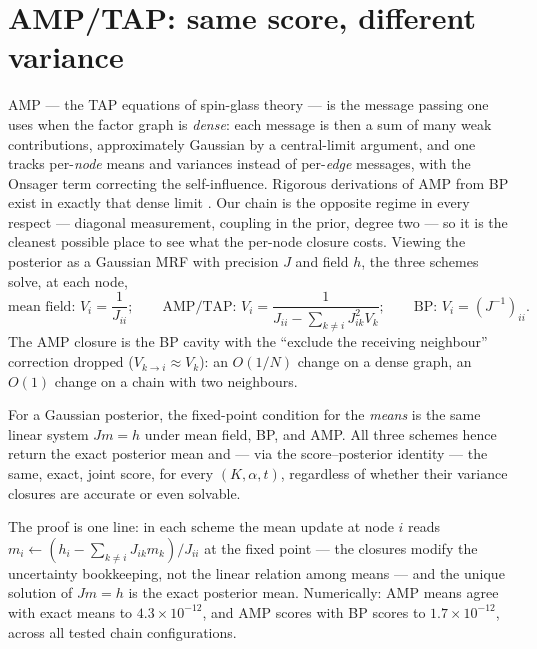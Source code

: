 \section{AMP/TAP: same score, different variance}\label{sec:bp-amp}

AMP --- the TAP equations of spin-glass theory
\citep{thouless1977solution, donoho2009message, zdeborova2016statistical}
--- is the message passing one uses when the factor graph is \emph{dense}:
each message is then a sum of many weak contributions, approximately
Gaussian by a central-limit argument, and one tracks per-\emph{node} means
and variances instead of per-\emph{edge} messages, with the Onsager term
correcting the self-influence. Rigorous derivations of AMP from BP exist
in exactly that dense limit \citep{genovese2026amp}. Our chain is the
opposite regime in every respect --- diagonal measurement, coupling in the
prior, degree two --- so it is the cleanest possible place to see what the
per-node closure costs. Viewing the posterior as a Gaussian MRF with
precision $J$ and field $h$, the three schemes solve, at each node,
\begin{equation}
  \text{mean field: } V_i = \frac{1}{J_{ii}};
  \qquad
  \text{AMP/TAP: } V_i = \frac{1}{J_{ii} - \sum_{k \neq i} J_{ik}^2 V_k};
  \qquad
  \text{BP: } V_i = (J^{-1})_{ii} .
  \label{eq:bp-three-closures}
\end{equation}
The AMP closure is the BP cavity with the ``exclude the receiving
neighbour'' correction dropped ($V_{k \to i} \approx V_k$): an $O(1/N)$
change on a dense graph, an $O(1)$ change on a chain with two neighbours.

\begin{theorem}\label{thm:bp-same-score}
For a Gaussian posterior, the fixed-point condition for the \emph{means}
is the same linear system $J m = h$ under mean field, BP, and AMP. All
three schemes hence return the exact posterior mean and --- via the
score--posterior identity --- the same, exact, joint score, for every
$(K, \alpha, t)$, regardless of whether their variance closures are
accurate or even solvable.
\end{theorem}

The proof is one line: in each scheme the mean update at node $i$ reads
$m_i \leftarrow (h_i - \sum_{k \neq i} J_{ik} m_k)/J_{ii}$ at the fixed
point --- the closures modify the uncertainty bookkeeping, not the linear
relation among means --- and the unique solution of $Jm = h$ is the exact
posterior mean. Numerically: AMP means agree with exact means to
$4.3 \times 10^{-12}$, and AMP scores with BP scores to
$1.7 \times 10^{-12}$, across all tested chain configurations.

